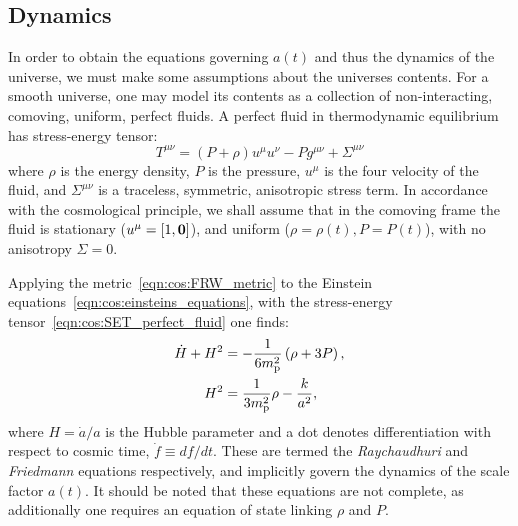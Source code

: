 \subsection{Dynamics}
In order to obtain the equations governing $a(t)$ and thus the dynamics of the universe, we must make some assumptions about the universes contents. For a smooth universe, one may model its contents as a collection of non-interacting, comoving, uniform, perfect fluids. A perfect fluid in thermodynamic equilibrium has stress-energy tensor:
\begin{equation}
  T^{\mu\nu} = (P+\rho)u^{\mu}u^{\nu} - P g^{\mu\nu} + \Sigma^{\mu\nu}
  \label{eqn:cos:SET_perfect_fluid}
\end{equation}
where $\rho$ is the energy density, $P$ is the pressure, $u^\mu$ is the four velocity of the fluid, and $\Sigma^{\mu\nu}$ is a traceless, symmetric, anisotropic stress term. In accordance with the cosmological principle, we shall assume that in the comoving frame the fluid is stationary ($u^\mu = [1,\mathbf{0}]$), and uniform ($\rho=\rho(t),P=P(t)$), with no anisotropy $\Sigma=0$.  

Applying the metric~\eqref{eqn:cos:FRW_metric} to the Einstein equations~\eqref{eqn:cos:einsteins_equations}, with the stress-energy tensor~\eqref{eqn:cos:SET_perfect_fluid} one finds:
\begin{align}
  \dot{H}+H^2 &= 
  -\frac{1}{6m_{\mathrm{p}}^2}\left( \rho + 3P\right), 
  \label{eqn:cos:Raychaudhuri}
  \\
  H^2 &= 
  \frac{1}{3m_{\mathrm{p}}^2}\rho - \frac{k}{a^2}, 
  \label{eqn:cos:Friedmann}
\end{align}
%
where $H=\dot{a}/a$ is the Hubble parameter and a dot denotes differentiation with respect to cosmic time, $\dot{f}\equiv df/dt$. These are termed the {\em Raychaudhuri\/} and {\em Friedmann\/} equations respectively, and implicitly govern the dynamics of the scale factor $a(t)$. It should be noted that these equations are not complete, as additionally one requires an equation of state linking $\rho$ and $P$.

